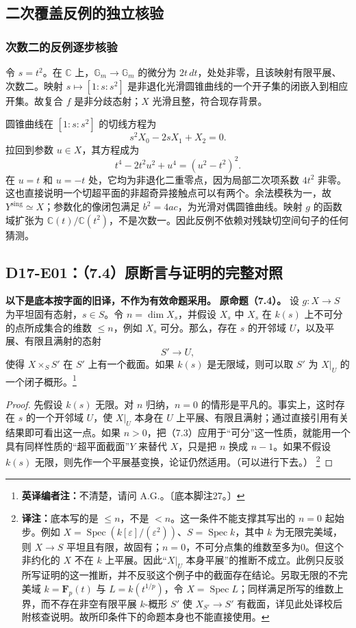 \documentclass[UTF8,a4paper]{ctexbook}
\newcommand{\transnote}[1]{\ifhmode\unskip\nobreak\fi\footnote{\textbf{译注：}#1}}
\DeclareMathOperator{\Spec}{Spec}
\newcommand{\ednote}[1]{\footnote{\textbf{英译编者注：}#1}}
\begin{document}
\subsection*{二次覆盖反例的独立核验}
\subsubsection*{次数二的反例逐步核验}
令 $s=t^2$。在 $\mathbb C$ 上，$\mathbb G_m\to\mathbb G_m$ 的微分为 $2t\,dt$，处处非零，且该映射有限平展、次数二。映射 $s\mapsto[1:s:s^2]$ 是非退化光滑圆锥曲线的一个开子集的闭嵌入到相应开集。故复合 $f$ 是非分歧态射；$X$ 光滑且整，符合现存背景。

圆锥曲线在 $[1:s:s^2]$ 的切线方程为
\[
s^2X_0-2sX_1+X_2=0.
\]
拉回到参数 $u\in X$，其方程成为
\[
t^4-2t^2u^2+u^4=(u^2-t^2)^2.
\]
在 $u=t$ 和 $u=-t$ 处，它均为非退化二重零点，因为局部二次项系数 $4t^2$ 非零。这也直接说明一个切超平面的非超奇异接触点可以有两个。余法模秩为一，故 ${Y^{\mathrm{sing}}}\simeq X$；参数化的像闭包满足 $b^2=4ac$，为光滑对偶圆锥曲线。映射 $g$ 的函数域扩张为 $\mathbb C(t)/\mathbb C(t^2)$，不是次数一。因此反例不依赖对残缺切空间句子的任何猜测。


\subsection*{D17-E01：（7.4）原断言与证明的完整对照}
\noindent\textbf{以下是底本按字面的旧译，不作为有效命题采用。}
\noindent\textbf{原命题（7.4）。}
设 $g:X\to S$ 为平坦固有态射，$s\in S$。令 $n=\dim X_s$，并假设 $X_s$ 中 $X_s$ 在 $k(s)$ 上不可分的点所成集合的维数 $\leq n$，例如 $X_s$ 可分。那么，存在 $s$ 的开邻域 $U$，以及平展、有限且满射的态射
\[
 S'\longrightarrow U,
\]
使得 $X\times_S S'$ 在 $S'$ 上有一个截面。如果 $k(s)$ 是无限域，则可以取 $S'$ 为 $X|_U$ 的一个闭子概形。\ednote{不清楚，请问 A.G.。〔底本脚注27。〕}
\begin{proof}
先假设 $k(s)$ 无限。对 $n$ 归纳，$n=0$ 的情形是平凡的。事实上，这时存在 $s$ 的一个开邻域 $U$，使 $X|_U$ 本身在 $U$ 上平展、有限且满射；通过直接引用有关结果即可看出这一点。如果 $n>0$，把（7.3）应用于“可分”这一性质，就能用一个具有同样性质的“超平面截面”$Y$ 来替代 $X$，只是把 $n$ 换成 $n-1$。如果不假设 $k(s)$ 无限，则先作一个平展基变换，论证仍然适用。（可以进行下去。）
\transnote{底本写的是 $\leq n$，不是 $<n$。这一条件不能支撑其写出的 $n=0$ 起始步。例如 $X=\Spec(k[\varepsilon]/(\varepsilon^2))$、$S=\Spec k$，其中 $k$ 为无限完美域，则 $X\to S$ 平坦且有限，故固有；$n=0$，不可分点集的维数至多为0。但这个非约化的 $X$ 不在 $k$ 上平展。因此“$X|_U$ 本身平展”的推断不成立。此例只反驳所写证明的这一推断，并不反驳这个例子中的截面存在结论。另取无限的不完美域 $k=\mathbf F_p(t)$ 与 $L=k(t^{1/p})$，令 $X=\Spec L$；同样满足所写的维数上界，而不存在非空有限平展 $k$-概形 $S'$ 使 $X_{S'}\to S'$ 有截面，详见此处译校后附核查说明。故所印条件下的命题本身也不能直接使用。}
\end{proof}
\end{document}
